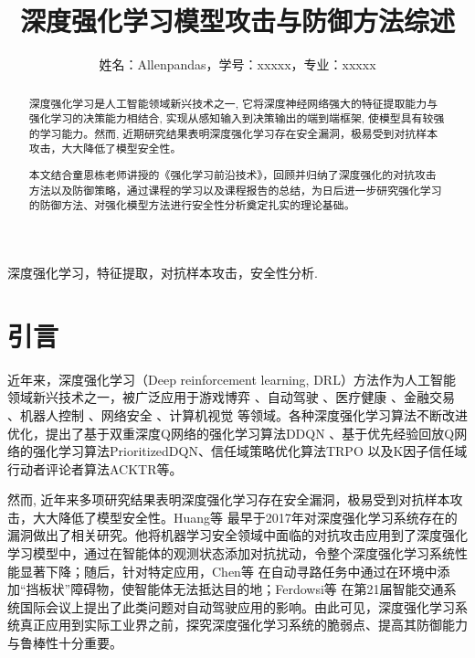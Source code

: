 \documentclass[lettersize,journal]{IEEEtran}
\begin{document}
\title{深度强化学习模型攻击与防御方法综述}

\author{姓名：Allenpandas，学号：xxxxx，专业：xxxxx}




\maketitle

\begin{abstract}
深度强化学习是人工智能领域新兴技术之一, 它将深度神经网络强大的特征提取能力与强化学习的决策能力相结合, 实现从感知输入到决策输出的端到端框架, 使模型具有较强的学习能力。然而, 近期研究结果表明深度强化学习存在安全漏洞，极易受到对抗样本攻击，大大降低了模型安全性。

本文结合童恩栋老师讲授的《强化学习前沿技术》，回顾并归纳了深度强化的对抗攻击方法以及防御策略，通过课程的学习以及课程报告的总结，为日后进一步研究强化学习的防御方法、对强化模型方法进行安全性分析奠定扎实的理论基础。
\end{abstract}

\begin{IEEEkeywords}
深度强化学习，特征提取，对抗样本攻击，安全性分析.
\end{IEEEkeywords}



\section*{引言}
\quad 近年来，深度强化学习（Deep reinforcement learning, DRL）方法作为人工智能领域新兴技术之一，被广泛应用于游戏博弈\cite{silver2016mastering} 、自动驾驶\cite{fayjie2018driverless} 、医疗健康\cite{prasad2017reinforcement} 、金融交易\cite{deng2016deep} 、机器人控制\cite{amarjyoti2017deep} 、网络安全\cite{nguyen2021deep} 、计算机视觉\cite{oh2015action} 等领域。各种深度强化学习算法不断改进优化，提出了基于双重深度Q网络的强化学习算法DDQN\cite{mnih2013playing} 、基于优先经验回放Q网络的强化学习算法PrioritizedDQN、信任域策略优化算法TRPO\cite{schulman2015trust} 以及K因子信任域行动者评论者算法ACKTR\cite{wu2017scalable}等。

\quad 然而, 近年来多项研究结果表明深度强化学习存在安全漏洞，极易受到对抗样本攻击，大大降低了模型安全性。Huang等\cite{huang2017adversarial} 最早于2017年对深度强化学习系统存在的漏洞做出了相关研究。他将机器学习安全领域中面临的对抗攻击应用到了深度强化学习模型中，通过在智能体的观测状态添加对抗扰动，令整个深度强化学习系统性能显著下降；随后，针对特定应用，Chen等\cite{chen2018gradient} 在自动寻路任务中通过在环境中添加“挡板状”障碍物，使智能体无法抵达目的地；Ferdowsi等\cite{ferdowsi2018robust} 在第21届智能交通系统国际会议上提出了此类问题对自动驾驶应用的影响。由此可见，深度强化学习系统真正应用到实际工业界之前，探究深度强化学习系统的脆弱点、提高其防御能力与鲁棒性十分重要。
\end{document}
